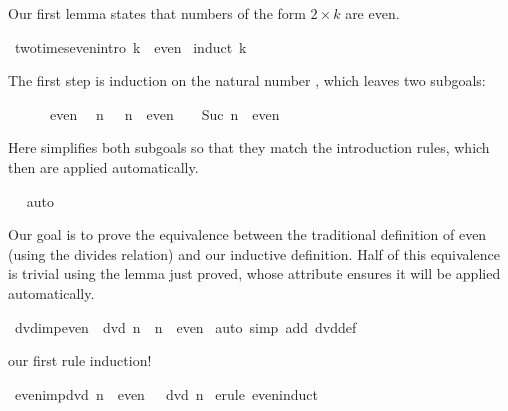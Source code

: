 \begin{isabellebody}
\begin{isamarkuptext}
Our first lemma states that numbers of the form $2\times k$ are even.%
\end{isamarkuptext}%
\isamarkuptrue%
\ two{\isacharunderscore}times{\isacharunderscore}even{\isacharbrackleft}intro{\isacharbang}{\isacharbrackright}{\isacharcolon}\ {\isachardoublequote}{}{\isacharasterisk}k\ {\isasymin}\ even{\isachardoublequote}\isanewline
\isamarkupfalse%
\ {\isacharparenleft}induct\ {\isachardoublequote}k{\isachardoublequote}{\isacharparenright}\isamarkupfalse%
%
\begin{isamarkuptxt}%
The first step is induction on the natural number , which leaves
two subgoals:
\begin{isabelle}%
\ {}{\isachardot}\ {}\ {\isacharasterisk}\ {}\ {\isasymin}\ even\isanewline
\ {}{\isachardot}\ {\isasymAnd}n{\isachardot}\ {}\ {\isacharasterisk}\ n\ {\isasymin}\ even\ {\isasymLongrightarrow}\ {}\ {\isacharasterisk}\ Suc\ n\ {\isasymin}\ even%
\end{isabelle}
Here  simplifies both subgoals so that they match the introduction
rules, which then are applied automatically.%
\end{isamarkuptxt}%
\ \isamarkuptrue%
\ auto\isanewline
\isamarkupfalse%
\isamarkupfalse%
%
\begin{isamarkuptext}%
Our goal is to prove the equivalence between the traditional definition
of even (using the divides relation) and our inductive definition.  Half of
this equivalence is trivial using the lemma just proved, whose 
attribute ensures it will be applied automatically.%
\end{isamarkuptext}%
\isamarkuptrue%
\ dvd{\isacharunderscore}imp{\isacharunderscore}even{\isacharcolon}\ {\isachardoublequote}{}\ dvd\ n\ {\isasymLongrightarrow}\ n\ {\isasymin}\ even{\isachardoublequote}\isanewline
\isamarkupfalse%
\ {\isacharparenleft}auto\ simp\ add{\isacharcolon}\ dvd{\isacharunderscore}def{\isacharparenright}\isamarkupfalse%
%
\begin{isamarkuptext}%
our first rule induction!%
\end{isamarkuptext}%
\isamarkuptrue%
\ even{\isacharunderscore}imp{\isacharunderscore}dvd{\isacharcolon}\ {\isachardoublequote}n\ {\isasymin}\ even\ {\isasymLongrightarrow}\ {}\ dvd\ n{\isachardoublequote}\isanewline
\isamarkupfalse%
\ {\isacharparenleft}erule\ even{\isachardot}induct{\isacharparenright}\isamarkupfalse%

\end{isabellebody}
